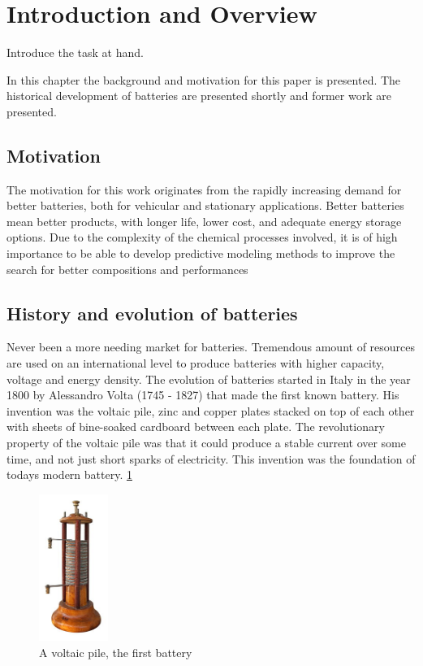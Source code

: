 \section{Introduction and Overview}
Introduce the task at hand.


In this chapter the background and motivation for this paper is presented. The historical development of batteries are presented shortly and former work are presented. 

 
\subsection{Motivation}

The motivation for this work originates from the rapidly increasing demand for better batteries, both for vehicular and stationary applications. Better batteries mean better products, with longer life, lower cost, and adequate energy storage options. Due to the complexity of the chemical processes involved, it is of high importance to be able to develop predictive modeling methods to improve the search for better compositions and performances






\subsection{History and evolution of batteries}
Never been a more needing market for batteries. Tremendous amount of resources are used on an international level to produce batteries with higher capacity, voltage and energy density. The evolution of batteries started in Italy in the year 1800 by Alessandro Volta (1745 - 1827) that made the first known battery\cite{volta1800electricity}. His invention was the voltaic pile, zinc and copper plates stacked on top of each other with sheets of  bine-soaked cardboard between each plate. The revolutionary property of the voltaic pile was that it could produce a stable current over some time, and not just short sparks of electricity. This invention was the foundation of todays modern battery. \ref{fig:voltaicpile}


\begin{figure}[H]
    \centering
    \includegraphics[width=0.2\textwidth]{Pila_di_Volta.jpg}
    \caption{A voltaic pile, the first battery \cite{wiki:voltaicpile} }
    \label{fig:voltaicpile}
\end{figure}

